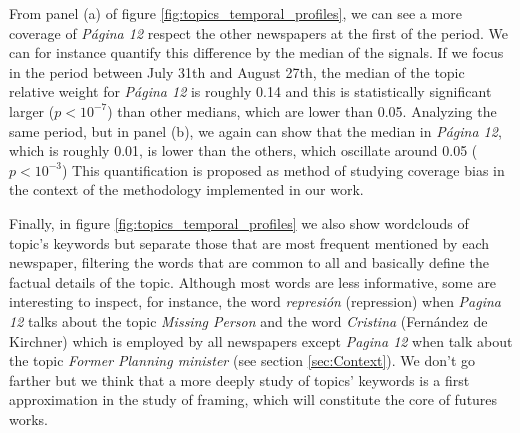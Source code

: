 \par From panel (a) of figure \ref{fig:topics_temporal_profiles}, we can see a more coverage of \emph{Página 12} respect the other newspapers at the first of the period. We can for instance quantify this difference by the median of the signals. If we focus in the period between July 31th and August 27th, the median of the topic relative weight for \emph{Página 12} is roughly 0.14 and this is statistically significant larger ($p < 10^{-7}$) than other medians, which are lower than 0.05.
Analyzing the same period, but in panel (b), we again can show that the median in \emph{Página 12}, which is roughly 0.01, is lower than the others, which oscillate around 0.05 ($p<10^{-3}$)
This quantification is proposed as method of studying coverage bias in the context of the methodology implemented in our work. 

\par Finally, in figure \ref{fig:topics_temporal_profiles} we also show wordclouds of topic's keywords but separate those that are most frequent mentioned by each newspaper, filtering the words that are common to all and basically define the factual details of the topic.
Although most words are less informative, some are interesting to inspect, for instance, the word \emph{represión} (repression) when \emph{Pagina 12} talks about the topic \emph{Missing Person} and the word \emph{Cristina} (Fernández de Kirchner) which is employed by all newspapers except \emph{Pagina 12} when talk about the topic \emph{Former Planning minister} (see section \ref{sec:Context}).
We don't go farther but we think that a more deeply study of topics' keywords is a first approximation in the study of framing, which will constitute the core of futures works.
